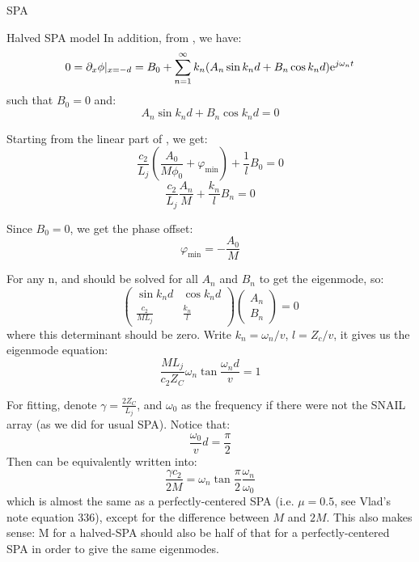 \documentclass[12pt,a4paper]{article}
\begin{document}
\begin{section}{SPA}
\begin{subsection}{Halved SPA model}
In addition, from , we have: 
\begin{equation}
0 = \partial_x \phi |_{x=-d} = B_0 + \sum_{n=1}^\infty{ k_n (A_n \sin k_n d  + B_n \cos k_n d)\mathrm{e}^{j\omega_n t}} 
\end{equation}
such that $B_0 = 0$ and: 
\begin{equation}\label{eq:1}
A_n \sin k_n d  + B_n \cos k_n d = 0
\end{equation}

Starting from the linear part of , we get: 
\begin{equation}
\frac{c_2}{L_j} \left( \frac{A_0}{M\phi_0} + \varphi_{\mathrm{min}} \right) + \frac{1}{l} B_0 = 0
\end{equation}
\begin{equation}\label{eq:2}
\frac{c_2}{L_j} \frac{A_n}{M} + \frac{k_n}{l} B_n = 0
\end{equation}

Since $B_0 = 0$, we get the phase offset: 
\begin{equation}
\varphi_{\mathrm{min}} = - \frac{A_0}{M}
\end{equation}

For any n,  and  should be solved for all $A_n$ and $B_n$ to get the eigenmode, so: 
\begin{equation}
\left(
\begin{matrix}
\sin{k_n d}&\cos{k_n d}\\
\frac{c_2}{M L_j}&\frac{k_n}{l}
\end{matrix}
\right)
\left(
\begin{matrix}
A_n\\
B_n
\end{matrix}
\right)=0
\end{equation}
where this determinant should be zero. Write $k_n = \omega_n/v$, $l=Z_c/v$, it gives us the eigenmode equation: 
\begin{equation}\label{eq:halved}
\frac{M L_j}{c_2 Z_C}\omega_n\tan{\frac{\omega_n d}{v}} = 1
\end{equation}

For fitting, denote $\gamma = \frac{2Z_C}{L_j}$, and $\omega_0$ as the frequency if there were not the SNAIL array (as we did for usual SPA). Notice that: 
\begin{equation}\label{eq:f0}
\frac{\omega_0}{v}d = \frac{\pi}{2}
\end{equation}
Then  can be equivalently written into: 
\begin{equation}\label{eq:eigen_naive}
\frac{\gamma c_2}{2M} = \omega_n\tan{\frac{\pi}{2}\frac{\omega_n}{\omega_0}}
\end{equation}
which is almost the same as a perfectly-centered SPA (i.e. $\mu = 0.5$, see Vlad's note equation 336), except for the difference between $M$ and $2M$. This also makes sense: M for a halved-SPA should also be half of that for a perfectly-centered SPA in order to give the same eigenmodes. 


\end{subsection}
\end{section}
\end{document}

